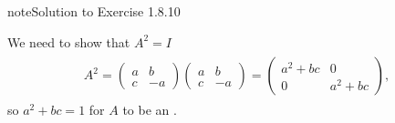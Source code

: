 \documentclass[letterpaper,10pt,english]{jupyterBook}
\begin{document}
\begin{sphinxadmonition}{note}{Solution to Exercise 1.8.10}



\sphinxAtStartPar
We need to show that \(A^2 = I\)
\begin{equation*}
\begin{split} \begin{align*}
    A^2 =
    \begin{pmatrix} a & b \\ c & -a \end{pmatrix} 
    \begin{pmatrix} a & b \\ c & -a \end{pmatrix} 
    = 
    \begin{pmatrix} a^2 + bc & 0 \\ 0 & a^2 + bc \end{pmatrix},
\end{align*} \end{split}
\end{equation*}
\sphinxAtStartPar
so \(a^2 + bc = 1\) for \(A\) to be an .
\end{sphinxadmonition}
 \label{_pages/A1_Matrices_exercises_solutions:_pages/A1_Matrices_exercises_solutions-solution-10}
\end{document}
